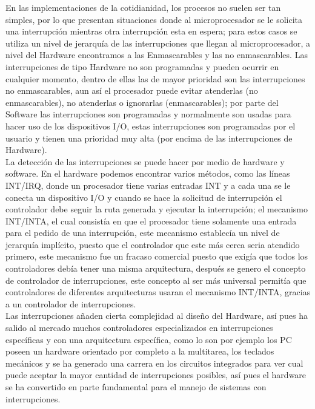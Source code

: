\documentclass{article}
\begin{document}
En las implementaciones de la cotidianidad, los procesos no suelen ser tan simples, por lo que presentan situaciones donde al microprocesador se le solicita una interrupción mientras otra interrupción esta en espera; para estos casos se utiliza un nivel de jerarquía de las interrupciones que llegan al microprocesador, a nivel del Hardware encontramos a las Enmascarables y las no enmascarables. Las interrupciones de tipo Hardware no son programadas y pueden ocurrir en cualquier momento, dentro de ellas las de mayor prioridad son las interrupciones no enmascarables, aun así el procesador puede evitar atenderlas (no enmascarables), no atenderlas o ignorarlas (enmascarables); por parte del Software las interrupciones son programadas y normalmente son usadas para hacer uso de los dispositivos  I/O, estas interrupciones son programadas por el usuario y tienen una prioridad muy alta (por encima de las interrupciones de Hardware).\\

La detección de las interrupciones se puede hacer por medio de hardware y software. En el hardware podemos encontrar varios métodos, como las líneas INT/IRQ, donde un procesador tiene varias entradas INT y a cada una se le conecta un dispositivo I/O y cuando se hace la solicitud de interrupción el controlador debe seguir la ruta generada y ejecutar la interrupción; el mecanismo INT/INTA, el cual consistía en que el procesador tiene solamente una entrada para el pedido de una interrupción, este mecanismo establecía un nivel de jerarquía implícito, puesto que el controlador que este más cerca seria atendido primero, este mecanismo fue un fracaso comercial puesto que exigía que todos los controladores debía tener una misma arquitectura, después se genero el concepto de controlador de interrupciones, este concepto al ser más universal permitía que controladores de diferentes arquitecturas usaran el mecanismo INT/INTA, gracias a un controlador de interrupciones.\\

Las interrupciones añaden cierta complejidad al diseño del Hardware, así pues ha salido al mercado muchos controladores especializados en interrupciones específicas y con una arquitectura específica, como lo son por ejemplo los PC poseen un hardware orientado por completo a la multitarea, los teclados mecánicos y se ha generado una carrera en los circuitos integrados para ver cual puede aceptar la mayor cantidad de interrupciones  posibles, así pues el hardware se ha convertido en parte fundamental para el manejo de sistemas con interrupciones.\\
\end{document}
